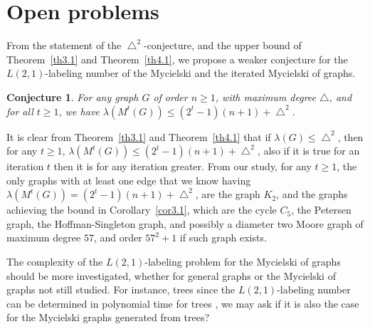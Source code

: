 \documentclass{article}
\newtheorem{con} {Conjecture}
\newtheorem{open problem} {Open Problem}
\numberwithin{lemma}{section}
\numberwithin{theorem}{section}
\numberwithin{cor}{section}
\numberwithin{prop}{section}
\numberwithin{con}{section}
\numberwithin{claim}{section}
\numberwithin{obs}{section}
\numberwithin{dnt}{section}
\begin{document}
\section{Open problems}
From the statement of the $\bigtriangleup^2$-conjecture, and the upper bound of Theorem~\ref{th3.1} and Theorem~\ref{th4.1}, we propose a weaker conjecture for the $L(2,1)$-labeling number of the Mycielski and the iterated Mycielski of graphs.
\begin{con}
	For any graph $G$ of order $n\geq 1$, with maximum degree $\bigtriangleup$, and for all $t\geq 1$, we have $\lambda(M^t (G))\leq  (2^t-1)(n+1)+\bigtriangleup^2$.
\end{con}
It is clear from Theorem~\ref{th3.1} and Theorem~\ref{th4.1} that if $\lambda(G)\leq \bigtriangleup^2$, then for any $t\geq 1$, $\lambda(M^t (G))\leq  (2^t-1)(n+1)+\bigtriangleup^2$, also if it is true for an iteration $t$ then it is for any iteration greater. From our study, for any $t\geq 1$, the only graphs with at least one edge that we know having $\lambda(M^t (G))=(2^t-1)(n+1)+\bigtriangleup^2$, are the graph $K_2$, and the graphs achieving the bound in Corollary~\ref{cor3.1}, which are the cycle $C_5$, the Petersen graph, the Hoffman-Singleton graph, and possibly a diameter two Moore graph of maximum degree $57$, and order $57^2+1$ if such graph exists.  
\par The complexity of the $L(2,1)$-labeling problem for the Mycielski of graphs should be more investigated, whether for general graphs or the Mycielski of graphs not still studied. For instance, trees since the $L(2,1)$-labeling number can be determined in polynomial time for trees \cite{changkuo}, we may ask if it is also the case for the Mycielski graphs generated from trees?
\end{document}
